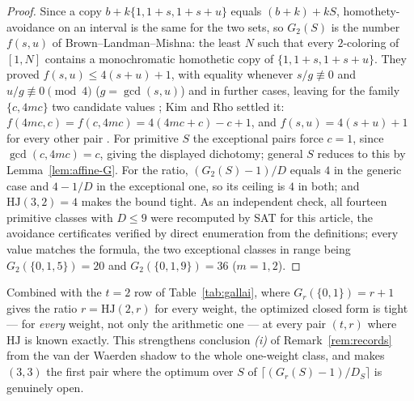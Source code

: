 \documentclass[12pt]{article}
\newcommand{\HJ}{\mathrm{HJ}}
\begin{document}
\begin{proof}
Since a copy $b+k\{1,1+s,1+s+u\}$ equals $(b+k)+kS$, homothety-avoidance
on an interval is the same for the two sets, so $G_{2}(S)$ is the
number $f(s,u)$ of Brown--Landman--Mishna: the least $N$ such that
every $2$-coloring of $[1,N]$ contains a monochromatic homothetic copy
of $\{1,1+s,1+s+u\}$. They proved $f(s,u)\le 4(s+u)+1$, with equality
whenever $s/g\not\equiv 0$ and $u/g\not\equiv 0\pmod 4$
($g=\gcd(s,u)$) and in further cases, leaving for the family
$\{c,4mc\}$ two candidate values \cite{BrownLandmanMishna1997}; Kim and
Rho settled it: $f(4mc,c)=f(c,4mc)=4(4mc+c)-c+1$, and
$f(s,u)=4(s+u)+1$ for every other pair \cite[Theorem~12]{KimRho2012}.
For primitive $S$ the exceptional pairs force $c=1$, since
$\gcd(c,4mc)=c$, giving the displayed dichotomy; general $S$ reduces to this by
Lemma~\ref{lem:affine-G}. For the ratio, $(G_{2}(S)-1)/D$ equals $4$ in
the generic case and $4-1/D$ in the exceptional one, so its ceiling is
$4$ in both; and $\HJ(3,2)=4$ \cite{firstnontrivialHJ_is_4} makes the
bound tight. As an independent check, all fourteen primitive classes
with $D\le 9$ were recomputed by SAT for this article, the avoidance
certificates verified by direct enumeration from the definitions; every
value matches the formula, the two exceptional classes in range being
$G_{2}(\{0,1,5\})=20$ and $G_{2}(\{0,1,9\})=36$ ($m=1,2$).
\end{proof}

Combined with the $t=2$ row of Table~\ref{tab:gallai}, where
$G_{r}(\{0,1\})=r+1$ gives the ratio $r=\HJ(2,r)$ for every weight, the
optimized closed form is tight --- for \emph{every} weight, not only
the arithmetic one --- at every pair $(t,r)$ where $\HJ$ is known
exactly. This strengthens conclusion \emph{(i)} of
Remark~\ref{rem:records} from the van der Waerden shadow to the whole
one-weight class, and makes $(3,3)$ the first pair where the optimum
over $S$ of $\lceil(G_{r}(S)-1)/D_{S}\rceil$ is genuinely open.
\end{document}
